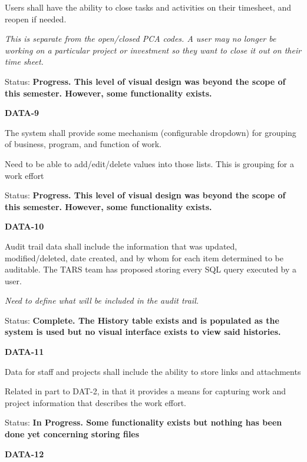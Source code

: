 \documentclass{article}
\begin{document}
\noindent Users shall have the ability to close tasks and activities on their timesheet, and reopen if needed.

\noindent \textit{This is separate from the open/closed PCA codes.  A user may no longer be working on a particular project or investment so they want to close it out on their time sheet.}

\noindent Status: \textbf{Progress.  This level of visual design was beyond the scope of this semester.  However, some functionality exists.}

\noindent \textit{}


\noindent \textbf{DATA-9}

\noindent The system shall provide some mechanism (configurable dropdown) for grouping of business, program, and function of work.

Need to be able to add/edit/delete values into those lists. This is grouping for a work effort

\noindent Status: \textbf{Progress.  This level of visual design was beyond the scope of this semester.  However, some functionality exists.}

\noindent \textit{}


\noindent \textbf{DATA-10}

\noindent Audit trail data shall include the information that was updated, modified/deleted, date created, and by whom for each item determined to be auditable. The TARS team has proposed storing every SQL query executed by a user.

 \textit{Need to define what will be included in the audit trail.}

\noindent Status: \textbf{Complete.  The History table exists and is populated as the system is used but no visual interface exists to view said histories.}\textit{}

\noindent \textit{}


\noindent \textbf{DATA-11}

\noindent Data for staff and projects shall include the ability to store links and attachments

\noindent Related in part to DAT-2, in that it provides a means for capturing work and project information that describes the work effort.

\noindent Status: \textbf{In Progress.  Some functionality exists but nothing has been done yet concerning storing files} 

\noindent \textit{}


\noindent \textbf{DATA-12}
\end{document}

